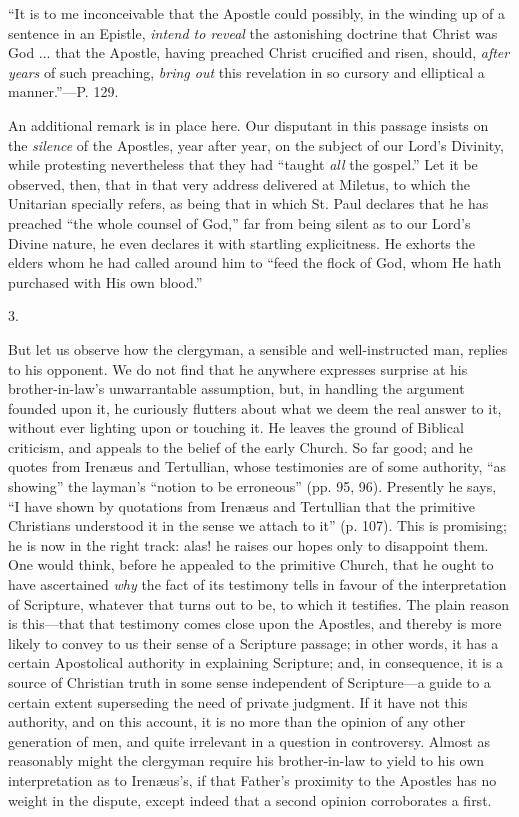 ``It
is to me inconceivable that the Apostle could possibly, in the winding
up of a sentence in an Epistle, \emph{intend to reveal} the
astonishing doctrine that Christ was God ... that the Apostle, having
preached Christ crucified and risen, should, \emph{after years} of
such preaching, \emph{bring out} this revelation in so cursory and
elliptical a manner.''—P. 129.

An additional remark is in place here. Our
disputant in this passage insists on the \emph{silence} of the
Apostles, year after year, on the subject of our Lord's Divinity,
while protesting nevertheless that they had ``taught \emph{all} the gospel.''
Let it be observed, then, that in that very address delivered at
Miletus, to which the Unitarian specially refers, as being that in
which St. Paul declares that he has preached ``the whole counsel of
God,'' far from being silent as to our Lord's Divine nature, he even
declares it with startling explicitness. He exhorts the elders whom he
had called around him to ``feed the flock of God, whom He hath
purchased with His own blood.''

3.

But let us observe how the clergyman, a sensible
and well-instructed man, replies to his opponent. We do not find that
he anywhere expresses surprise at his brother-in-law's unwarrantable
assumption, but, in handling the argument founded upon it, he
curiously flutters about what we deem the real answer to it, without
ever lighting upon or touching it. He leaves the ground of Biblical
criticism, and appeals to the belief of the early Church. So far good;
and he quotes from Irenæus and Tertullian, whose testimonies are of
some authority, ``as showing'' the layman's ``notion to be erroneous''
(pp. 95, 96). Presently he says, ``I have shown by quotations from Irenæus
and Tertullian that the primitive Christians understood it in the
sense we attach to it'' (p. 107). This is promising; he is now in the
right track: alas! he raises our hopes only to disappoint them. One
would think, before he appealed to the primitive Church, that he ought
to have ascertained \emph{why} the fact of its testimony tells in
favour of the interpretation of Scripture, whatever that turns out to
be, to which it testifies. The plain reason is this—that that
testimony comes close upon the Apostles, and thereby is more likely to
convey to us their sense of a Scripture passage; in other words, it
has a certain Apostolical authority in explaining Scripture; and, in
consequence, it is a source of Christian truth in some sense
independent of Scripture—a guide to a certain extent superseding the
need of private judgment. If it have not this authority, and on this
account, it is no more than the opinion of any other generation of
men, and quite irrelevant in a question in controversy. Almost as
reasonably might the clergyman require his brother-in-law to yield to
his own interpretation as to Irenæus's, if that Father's
proximity to the Apostles has no weight in the dispute, except indeed
that a second opinion corroborates a first.

